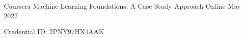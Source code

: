 

\begin{cventries}
  \cventry
    {Coursera} %
    {Machine Learning Foundations: A Case Study Approach} %
    {Online}
    {May 2022} %
    {
      \begin{cvitems} %
        \item {Credential ID: 2PNY97HX4AAK}
      \end{cvitems}
    }
\end{cventries}
